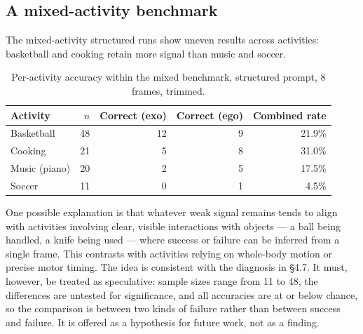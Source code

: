 \documentclass[logo,msc]{infthesis}
\begin{document}
\subsection{A mixed-activity benchmark}

The mixed-activity structured runs show uneven results across activities:
basketball and cooking retain more signal than music and soccer.

\begin{table}[H]
\centering
\caption{Per-activity accuracy within the mixed benchmark, structured
prompt, 8 frames, trimmed.}
\label{tab:mixed-activity}
\small
\begin{tabular}{@{}l r r r r@{}}
\toprule
\textbf{Activity} & \textbf{$n$} & \textbf{Correct (exo)}
 & \textbf{Correct (ego)} & \textbf{Combined rate} \\
\midrule
Basketball    & 48 & 12 & 9 & 21.9\% \\
Cooking       & 21 &  5 & 8 & 31.0\% \\
Music (piano) & 20 &  2 & 5 & 17.5\% \\
Soccer        & 11 &  0 & 1 &  4.5\% \\
\bottomrule
\end{tabular}
\end{table}

One possible explanation is that whatever weak signal remains tends to
align with activities involving clear, visible interactions with objects
--- a ball being handled, a knife being used --- where success or failure
can be inferred from a single frame. This contrasts with activities relying
on whole-body motion or precise motor timing. The idea is consistent with
the diagnosis in §4.7. It must, however, be treated as speculative: sample
sizes range from 11 to 48, the differences are untested for significance,
and all accuracies are at or below chance, so the comparison is between two
kinds of failure rather than between success and failure. It is offered as
a hypothesis for future work, not as a finding.
\end{document}
